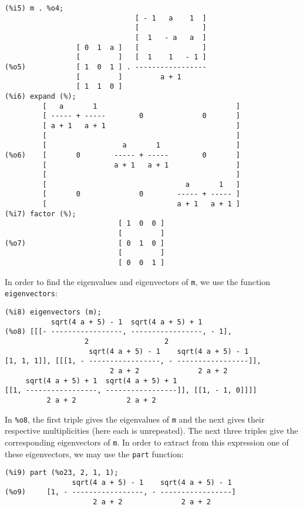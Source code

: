 \documentclass[a4paper,12pt]{article}
\begin{document}
\begin{verbatim}
(%i5) m . %o4;
                               [ - 1   a    1  ]
                               [               ]
                               [  1   - a   a  ]
                 [ 0  1  a ]   [               ]
                 [         ]   [  1    1   - 1 ]
(%o5)            [ 1  0  1 ] . -----------------
                 [         ]         a + 1
                 [ 1  1  0 ]
(%i6) expand (%);
         [   a       1                                 ]
         [ ----- + -----        0              0       ]
         [ a + 1   a + 1                               ]
         [                                             ]
         [                  a       1                  ]
(%o6)    [       0        ----- + -----        0       ]
         [                a + 1   a + 1                ]
         [                                             ]
         [                                 a       1   ]
         [       0              0        ----- + ----- ]
         [                               a + 1   a + 1 ]
(%i7) factor (%);
                           [ 1  0  0 ]
                           [         ]
(%o7)                      [ 0  1  0 ]
                           [         ]
                           [ 0  0  1 ]
\end{verbatim}
In order to find the eigenvalues and eigenvectors of {\tt m}, we use the function {\tt
eigenvectors}:

\noindent\begin{minipage}{\textwidth}
\begin{verbatim}
(%i8) eigenvectors (m);
           sqrt(4 a + 5) - 1  sqrt(4 a + 5) + 1
(%o8) [[[- -----------------, -----------------, - 1], 
                   2                  2
                    sqrt(4 a + 5) - 1    sqrt(4 a + 5) - 1
[1, 1, 1]], [[[1, - -----------------, - -----------------]], 
                         2 a + 2              2 a + 2
     sqrt(4 a + 5) + 1  sqrt(4 a + 5) + 1
[[1, -----------------, -----------------]], [[1, - 1, 0]]]]
          2 a + 2            2 a + 2
\end{verbatim}
  In {\tt \%o8}, the first triple gives the eigenvalues of {\tt m} and
  the next gives their respective multiplicities (here each is
  unrepeated).  The next three triples give the corresponding
  eigenvectors of {\tt m}.  In order to extract from this expression
  one of these eigenvectors, we may use the {\tt part} function:
\begin{verbatim}
(%i9) part (%o23, 2, 1, 1);
                sqrt(4 a + 5) - 1    sqrt(4 a + 5) - 1
(%o9)     [1, - -----------------, - -----------------]
                     2 a + 2              2 a + 2
\end{verbatim}
\end{minipage}
\end{document}
